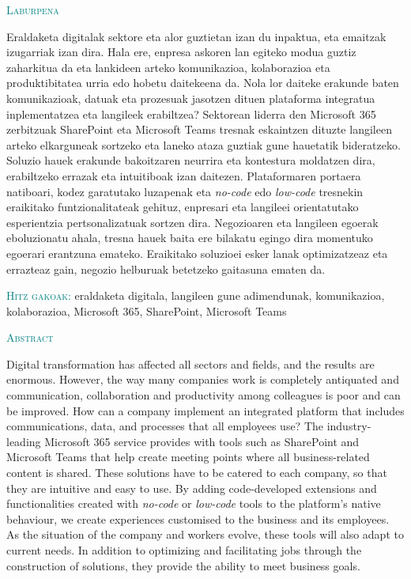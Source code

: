 \begin{center}
  {\Large \textsc{\textcolor{teal}{Laburpena}}}
\end{center}
%
\noindent
%
Eraldaketa digitalak sektore eta alor guztietan izan du inpaktua, eta emaitzak izugarriak izan dira. Hala ere, enpresa askoren lan egiteko modua guztiz zaharkitua da eta lankideen arteko komunikazioa, kolaborazioa eta produktibitatea urria edo hobetu daitekeena da. Nola lor daiteke erakunde baten komunikazioak, datuak eta prozesuak jasotzen dituen plataforma integratua inplementatzea eta langileek erabiltzea? Sektorean liderra den Microsoft 365 zerbitzuak SharePoint eta Microsoft Teams tresnak eskaintzen dituzte langileen arteko elkarguneak sortzeko eta laneko ataza guztiak gune hauetatik bideratzeko. Soluzio hauek erakunde bakoitzaren neurrira eta kontestura moldatzen dira, erabiltzeko errazak eta intuitiboak izan daitezen. Plataformaren portaera natiboari, kodez garatutako luzapenak eta \textit{no-code} edo \textit{low-code} tresnekin eraikitako funtzionalitateak gehituz, enpresari eta langileei orientatutako esperientzia pertsonalizatuak sortzen dira. Negozioaren eta langileen egoerak eboluzionatu ahala, tresna hauek baita ere bilakatu egingo dira momentuko egoerari erantzuna emateko. Eraikitako soluzioei esker lanak optimizatzeaz eta errazteaz gain, negozio helburuak betetzeko gaitasuna ematen da. 

\textsc{\textcolor{teal}{Hitz gakoak:}} eraldaketa digitala, langileen gune adimendunak, komunikazioa, kolaborazioa, Microsoft 365, SharePoint, Microsoft Teams

\vspace{2cm}

\begin{center}
  {\Large \textsc{\textcolor{teal}{Abstract}}}
\end{center}
%
\noindent
%
Digital transformation has affected all sectors and fields, and the results are enormous. However, the way many companies work is completely antiquated and communication, collaboration and productivity among colleagues is poor and can be improved. How can a company implement an integrated platform that includes communications, data, and processes that all employees use? 
The industry-leading Microsoft 365 service provides with tools such as SharePoint and Microsoft Teams that help create meeting points where all business-related content is shared. These solutions have to be catered to each company, so that they are intuitive and easy to use. By adding code-developed extensions and functionalities created with \textit{no-code} or \textit{low-code} tools to the platform's native behaviour, we create experiences customised to the business and its employees. As the situation of the company and workers evolve, these tools will also adapt to current needs. In addition to optimizing and facilitating jobs through the construction of solutions, they provide the ability to meet business goals.


